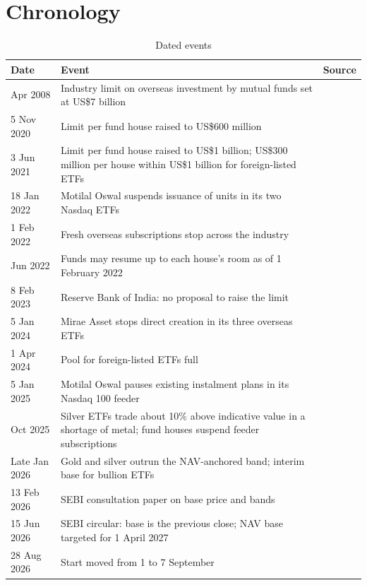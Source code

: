 \section{Chronology}\label{app:chronology}
\begin{table}[H]
\centering\small
\caption{Dated events}\label{tab:chronology}
\begin{tabularx}{\textwidth}{L{2.6cm}YL{3.3cm}}
\toprule
Date & Event & Source\\
\midrule
Apr 2008 & Industry limit on overseas investment by mutual funds set at US\$7 billion & \citet{lawasia2026}\\
5 Nov 2020 & Limit per fund house raised to US\$600 million & \citet{bs2020limit}\\
3 Jun 2021 & Limit per fund house raised to US\$1 billion; US\$300 million per house within US\$1 billion for foreign-listed ETFs & \citet{bs2021limit}\\
18 Jan 2022 & Motilal Oswal suspends issuance of units in its two Nasdaq ETFs & \citet{bs2022motilal}\\
1 Feb 2022 & Fresh overseas subscriptions stop across the industry & \citet{pti2022resume}\\
Jun 2022 & Funds may resume up to each house's room as of 1 February 2022 & \citet{pti2022resume}\\
8 Feb 2023 & Reserve Bank of India: no proposal to raise the limit & \citet{bs2023rbi}\\
5 Jan 2024 & Mirae Asset stops direct creation in its three overseas ETFs & \citet{mirae2024addendum}\\
1 Apr 2024 & Pool for foreign-listed ETFs full & \citet{zerodha2024etf}\\
5 Jan 2025 & Motilal Oswal pauses existing instalment plans in its Nasdaq 100 feeder & \citet{et2025motilal}\\
Oct 2025 & Silver ETFs trade about 10\% above indicative value in a shortage of metal; fund houses suspend feeder subscriptions & \citet{bs2025silver}\\
Late Jan 2026 & Gold and silver outrun the NAV-anchored band; interim base for bullion ETFs & \citet{sebi2026cp}\\
13 Feb 2026 & SEBI consultation paper on base price and bands & \citet{sebi2026cp}\\
15 Jun 2026 & SEBI circular: base is the previous close; NAV base targeted for 1 April 2027 & \citet{sebi2026circular}\\
28 Aug 2026 & Start moved from 1 to 7 September & \citet{sebi2026ext}\\

\end{tabularx}
\end{table}

